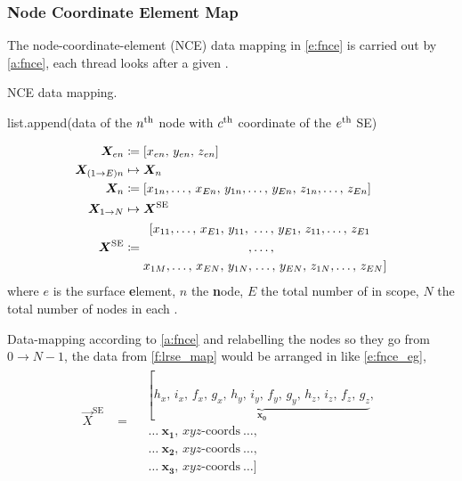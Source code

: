 	\subsubsection{Node Coordinate Element Map}
	The node-coordinate-element (NCE) data mapping in \cref{e:fnce} is carried out by \cref{a:fnce}, each thread looks after a given .
	\begin{algorithm}
		\caption{NCE data mapping.}
		\label{a:fnce}
		\begin{algorithmic}
			\State list.append(data of the $ n\textsuperscript{th}$ node with $ c\textsuperscript{th} $ coordinate of the $ e\textsuperscript{th} $ SE)
			\EndFor
			\EndFor
			\EndFor
		\end{algorithmic}
	\end{algorithm}
	\begin{subequations}\label{e:fnce}
		\begin{align}
			\vec{X}_{en}			&\coloneqq \left[x_{en},\, y_{en},\, z_{en}\right]\\
			\vec{X}_{(1\to E)n}		&\mapsto \vec{X}_{n} \nn
			\vec{X}_{n}				&\coloneqq \left[x_{1n},\ldots,\, x_{En},\, y_{1n},\ldots,\, y_{En},\, z_{1n},\ldots,\, z_{En}\right]\\
			\vec{X}_{1\to N}		&\mapsto \vec{X}^{\textrm{SE}}\nn
			\vec{X}^{\textrm{SE}}	&\coloneqq 
			\begin{aligned}
				\left[x_{11},\ldots,\, x_{E1},\, y_{11},\right.&\ldots,\, y_{E1},\, z_{11},\ldots,\, z_{E1}\\
				,&\ldots,\\
				x_{1M},\ldots,\, x_{EN},\, y_{1N},&\left.\ldots,\, y_{EN},\, z_{1N},\ldots,\, z_{EN}\right]
			\end{aligned}
		\end{align}
	\end{subequations}
	where $ e $ is the surface \textbf{e}lement, $ n $ the \textbf{n}ode, $ E $ the total number of  in scope, $ N $ the total number of nodes in each .
	
	Data-mapping according to \cref{a:fnce} and relabelling the nodes so they go from $ 0 \to N-1 $, the data from \cref{f:lrse_map} would be arranged in  like \cref{e:fnce_eg},
	\begin{align}\label{e:fnce_eg}
		\vec{X}^{\textrm{SE}} &= \begin{aligned}
			&\left[\underbrace{h_{x},\, i_{x},\, f_{x},\, g_{x},\, 
				h_{y},\, i_{y},\, f_{y},\, g_{y},\, 
				h_{z},\, i_{z},\, f_{z},\, g_{z}}_{\mathbf{x_{0}}}\right.,\\
			&~\ldots~\mathbf{x_{1}},\, xyz\textrm{-coords}~\ldots,\\
			&~\ldots~\mathbf{x_{2}},\, xyz\textrm{-coords}~\ldots,\\
			&~\ldots~\mathbf{x_{3}},\, xyz\textrm{-coords}~\ldots]
		\end{aligned}
	\end{align}
